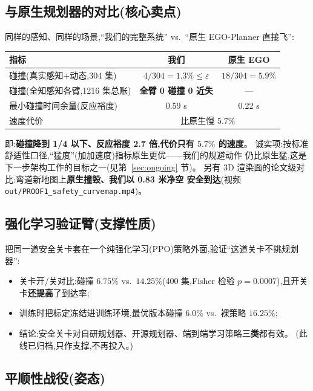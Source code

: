 \documentclass[11pt]{ctexart}
\newcommand{\code}[1]{\texttt{#1}}
\begin{document}
\subsection{与原生规划器的对比(核心卖点)}

同样的感知、同样的场景,``我们的完整系统'' vs.\ ``原生 EGO-Planner 直接飞'':

\begin{center}
\begin{tabular}{@{}lcc@{}}
\toprule
指标 & 我们 & 原生 EGO \\
\midrule
碰撞(真实感知+动态,304 集) & $4/304 = 1.3\% \le \varepsilon$ & $18/304 = 5.9\%$ \\
碰撞(全知感知各臂,1216 集总账) & \textbf{全臂 0 碰撞 0 近失} & --- \\
最小碰撞时间余量(反应裕度) & 0.59 s & 0.22 s \\
速度代价 & \multicolumn{2}{c}{比原生慢 $5.7\%$} \\
\bottomrule
\end{tabular}
\end{center}

即:\textbf{碰撞降到 1/4 以下、反应裕度 2.7 倍,代价只有 $5.7\%$ 的速度}。
诚实项:按标准舒适性口径,``猛度''(加加速度)指标原生更优——我们的规避动作
仍比原生猛,这是下一步架构工作的目标之一(见第~\ref{sec:ongoing} 节)。
另有 3D 渲染面的论文级对比:弯道新地图上\textbf{原生撞毁、我们以 0.83 米净空
安全到达}(视频 \code{out/PROOF1\_safety\_curvemap.mp4})。

\subsection{强化学习验证臂(支撑性质)}

把同一道安全关卡套在一个纯强化学习(PPO)策略外面,验证``这道关卡不挑规划器'':
\begin{itemize}
  \item 关卡开/关对比:碰撞 $6.75\%$ vs.\ $14.25\%$(400 集,Fisher 检验
        $p = 0.0007$),且开关卡\textbf{还提高}了到达率;
  \item 训练时把标定冻结进训练环境,最优版本碰撞 $6.0\%$ vs.\ 裸策略 $16.25\%$;
  \item 结论:安全关卡对自研规划器、开源规划器、端到端学习策略\textbf{三类}都有效。
        (此线已归档,只作支撑,不再投入。)
\end{itemize}

\subsection{平顺性战役(姿态)}
\end{document}
